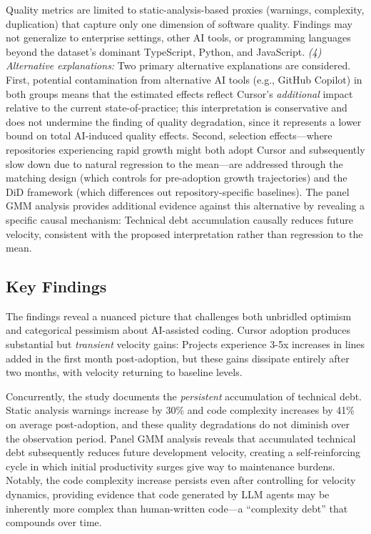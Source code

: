Quality metrics are limited to static-analysis-based proxies (warnings, complexity, duplication) that capture only one dimension of software quality.
Findings may not generalize to enterprise settings, other AI tools, or programming languages beyond the dataset's dominant TypeScript, Python, and JavaScript.
\emph{(4) Alternative explanations:} Two primary alternative explanations are considered.
First, potential contamination from alternative AI tools (e.g., GitHub Copilot) in both groups means that the estimated effects reflect Cursor's \emph{additional} impact relative to the current state-of-practice; this interpretation is conservative and does not undermine the finding of quality degradation, since it represents a lower bound on total AI-induced quality effects.
Second, selection effects---where repositories experiencing rapid growth might both adopt Cursor and subsequently slow down due to natural regression to the mean---are addressed through the matching design (which controls for pre-adoption growth trajectories) and the DiD framework (which differences out repository-specific baselines).
The panel GMM analysis provides additional evidence against this alternative by revealing a specific causal mechanism: Technical debt accumulation causally reduces future velocity, consistent with the proposed interpretation rather than regression to the mean.

\subsection{Key Findings}

The findings reveal a nuanced picture that challenges both unbridled optimism and categorical pessimism about AI-assisted coding.
Cursor adoption produces substantial but \emph{transient} velocity gains: Projects experience 3-5x increases in lines added in the first month post-adoption, but these gains dissipate entirely after two months, with velocity returning to baseline levels.

Concurrently, the study documents the \emph{persistent} accumulation of technical debt.
Static analysis warnings increase by 30\% and code complexity increases by 41\% on average post-adoption, and these quality degradations do not diminish over the observation period.
Panel GMM analysis reveals that accumulated technical debt subsequently reduces future development velocity, creating a self-reinforcing cycle in which initial productivity surges give way to maintenance burdens.
Notably, the code complexity increase persists even after controlling for velocity dynamics, providing evidence that code generated by LLM agents may be inherently more complex than human-written code---a ``complexity debt'' that compounds over time.


